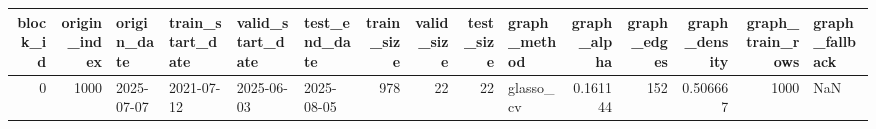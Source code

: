 \begin{tabular}{rrllllrrrlrrrrl}
\toprule
block_id & origin_index & origin_date & train_start_date & valid_start_date & test_end_date & train_size & valid_size & test_size & graph_method & graph_alpha & graph_edges & graph_density & graph_train_rows & graph_fallback \\
\midrule
0 & 1000 & 2025-07-07 & 2021-07-12 & 2025-06-03 & 2025-08-05 & 978 & 22 & 22 & glasso_cv & 0.161144 & 152 & 0.506667 & 1000 & NaN \\
\bottomrule
\end{tabular}
